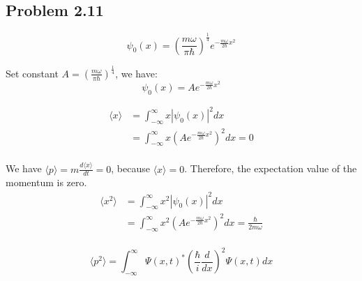 \documentclass{article}
\begin{document}
\subsection*{Problem 2.11}
\[\psi_0(x) = \left(\frac{m \omega}{\pi \hbar}\right)^\frac{1}{4} e^{-\frac{m \omega}{2\hbar}x^2}\]

Set constant \(A = \left(\frac{m \omega}{\pi \hbar}\right)^\frac{1}{4}\), we have:
\[\psi_0(x) = A e^{-\frac{m \omega}{2\hbar}x^2}\]

\begin{align*}
	\langle x \rangle & = \int_{-\infty}^{\infty} x |\psi_0(x)|^2 dx                             \\
	                  & = \int_{-\infty}^{\infty} x (A e^{-\frac{m \omega}{2\hbar}x^2})^2 dx = 0 \\
\end{align*}

We have \(\langle p \rangle = m \frac{d \langle x \rangle }{dt} = 0 \), because \(\langle x \rangle = 0\). Therefore, the expectation value of the momentum is zero.
\\
\begin{align*}
	\langle x^2 \rangle & = \int_{-\infty}^{\infty} x^2 |\psi_0(x)|^2 dx                                                   \\
	                    & = \int_{-\infty}^{\infty} x^2 (A e^{-\frac{m \omega}{2\hbar}x^2})^2 dx = \frac{\hbar}{2m \omega} \\
\end{align*}

\[\langle p^2 \rangle = \int_{-\infty}^{\infty} \Psi(x,t)^* \left(\frac{\hbar}{i} \frac{d}{dx}\right)^2 \Psi(x,t)dx\]
\end{document}
